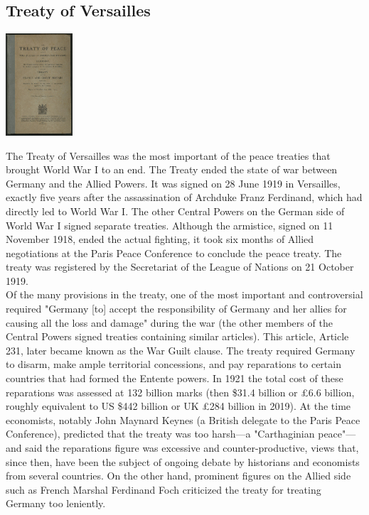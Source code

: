 \documentclass[11pt]{report}
\begin{document}
\subsection{Treaty of Versailles}
\vspace{2mm}\begin{center}\includegraphics[width=2.5cm]{./img/treatyOfVersailles.jpg}\end{center}
The Treaty of Versailles was the most important of the peace treaties that brought World War I to an end. The Treaty ended the state of war between Germany and the Allied Powers. It was signed on 28 June 1919 in Versailles, exactly five years after the assassination of Archduke Franz Ferdinand, which had directly led to World War I. The other Central Powers on the German side of World War I signed separate treaties. Although the armistice, signed on 11 November 1918, ended the actual fighting, it took six months of Allied negotiations at the Paris Peace Conference to conclude the peace treaty. The treaty was registered by the Secretariat of the League of Nations on 21 October 1919.\\
\indent Of the many provisions in the treaty, one of the most important and controversial required "Germany [to] accept the responsibility of Germany and her allies for causing all the loss and damage" during the war (the other members of the Central Powers signed treaties containing similar articles). This article, Article 231, later became known as the War Guilt clause. The treaty required Germany to disarm, make ample territorial concessions, and pay reparations to certain countries that had formed the Entente powers. In 1921 the total cost of these reparations was assessed at 132 billion marks (then \$31.4 billion or £6.6 billion, roughly equivalent to US \$442 billion or UK £284 billion in 2019). At the time economists, notably John Maynard Keynes (a British delegate to the Paris Peace Conference), predicted that the treaty was too harsh—a "Carthaginian peace"—and said the reparations figure was excessive and counter-productive, views that, since then, have been the subject of ongoing debate by historians and economists from several countries. On the other hand, prominent figures on the Allied side such as French Marshal Ferdinand Foch criticized the treaty for treating Germany too leniently.
\end{document}
